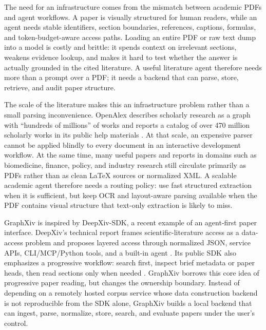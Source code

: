 \documentclass[10pt]{article}
\begin{document}
The need for an infrastructure comes from the mismatch between academic PDFs and agent workflows. A paper is visually structured for human readers, while an agent needs stable identifiers, section boundaries, references, captions, formulas, and token-budget-aware access paths. Loading an entire PDF or raw text dump into a model is costly and brittle: it spends context on irrelevant sections, weakens evidence lookup, and makes it hard to test whether the answer is actually grounded in the cited literature. A useful literature agent therefore needs more than a prompt over a PDF; it needs a backend that can parse, store, retrieve, and audit paper structure.

The scale of the literature makes this an infrastructure problem rather than a small parsing inconvenience. OpenAlex describes scholarly research as a graph with ``hundreds of millions'' of works and reports a catalog of over 470 million scholarly works in its public help materials \citep{openalexabout,openalexconcepts}. At that scale, an expensive parser cannot be applied blindly to every document in an interactive development workflow. At the same time, many useful papers and reports in domains such as biomedicine, finance, policy, and industry research still circulate primarily as PDFs rather than as clean LaTeX sources or normalized XML. A scalable academic agent therefore needs a routing policy: use fast structured extraction when it is sufficient, but keep OCR and layout-aware parsing available when the PDF contains visual structure that text-only extraction is likely to miss.

GraphXiv is inspired by DeepXiv-SDK, a recent example of an agent-first paper interface. DeepXiv's technical report frames scientific-literature access as a data-access problem and proposes layered access through normalized JSON, service APIs, CLI/MCP/Python tools, and a built-in agent \citep{qian2026deepxiv}. Its public SDK also emphasizes a progressive workflow: search first, inspect brief metadata or paper heads, then read sections only when needed \citep{deepxivgithub}. GraphXiv borrows this core idea of progressive paper reading, but changes the ownership boundary. Instead of depending on a remotely hosted corpus service whose data construction backend is not reproducible from the SDK alone, GraphXiv builds a local backend that can ingest, parse, normalize, store, search, and evaluate papers under the user's control.
\end{document}

